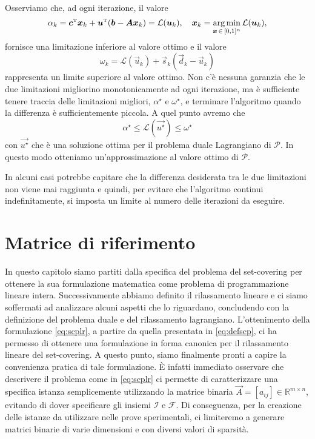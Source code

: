 \noindent
Osserviamo che, ad ogni iterazione, il valore
\begin{equation}
    \alpha_k = \bm{c}^{\scriptscriptstyle\mathrm{T}}\bm{x}_k +
    \bm{u}^{\scriptscriptstyle\mathrm{T}}(\bm{b}-\bm{A}\bm{x}_k) = \mathcal{L}(\bm{u}_k), \quad \bm{x}_k = \displaystyle\operatorname*{arg\,min}_{\bm{x} \,\in\,[0, 1]^n}
    \mathcal{L}(\bm{u}_k),
\end{equation}
fornisce una limitazione inferiore al valore ottimo e il valore
\begin{equation}
   \omega_k = \mathcal{L}(\vec{u}_k) + \vec{s}_k(\vec{d}_k - \vec{u}_k)
\end{equation}
rappresenta un limite superiore al valore ottimo. Non c'è nessuna garanzia che le due limitazioni migliorino
monotonicamente ad ogni iterazione, ma è sufficiente tenere traccia delle limitazioni migliori, \( \alpha^{\star} \) e
\( \omega^{\star} \), e terminare l'algoritmo quando la differenza è sufficientemente piccola. A quel punto avremo che
\begin{equation}
    \alpha^{\star} \leq \mathcal{L}(\vec{u^{\star}}) \leq \omega^{\star}
\end{equation}
con \( \vec{u^{\star}} \) che è una soluzione ottima per il problema duale Lagrangiano di \( \mathcal{P} \). In questo
modo otteniamo un'approssimazione al valore ottimo di \( \mathcal{P} \).

In alcuni casi potrebbe capitare che la differenza desiderata tra le due limitazioni non viene mai raggiunta e quindi,
per evitare che l'algoritmo continui indefinitamente, si imposta un limite al numero delle iterazioni da eseguire.

\section{Matrice di riferimento} \label{sec:refmat}
In questo capitolo siamo partiti dalla specifica del problema del set-covering per ottenere la sua
formulazione matematica come problema di programmazione lineare intera. Successivamente abbiamo definito il rilassamento
lineare e ci siamo soffermati ad analizzare alcuni aspetti che lo riguardano, concludendo con la definizione del
problema duale e del rilassamento lagrangiano. L'ottenimento della formulazione \eqref{eq:scplr}, a partire da quella
presentata in \eqref{eq:defscp}, ci ha permesso di ottenere una formulazione in forma canonica per il rilassamento
lineare del set-covering. A questo punto, siamo finalmente pronti a capire la convenienza pratica di tale formulazione.
\`E infatti immediato osservare che descrivere il problema come in \eqref{eq:scplr} ci permette di caratterizzare una
specifica istanza semplicemente utilizzando la matrice binaria \( \vec{A} = [a_{ij}] \in \mathbb{R}^{m\times n}\),
evitando di dover specificare gli insiemi \( \mathcal{I} \) e \( \mathcal{F} \). Di conseguenza, per la creazione delle
istanze da utilizzare nelle prove sperimentali, ci limiteremo a generare matrici binarie di varie dimensioni e con
diversi valori di sparsità.

